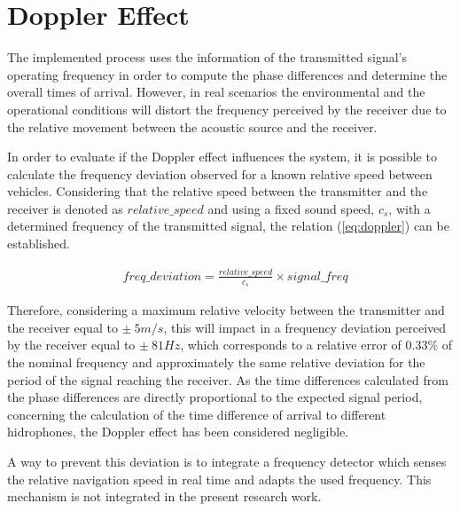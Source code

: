 \section{Doppler Effect}

The implemented process uses the information of the transmitted signal's operating frequency in order to compute the phase differences and determine the overall times of arrival. However, in real scenarios the environmental and the operational conditions will distort the frequency perceived by the receiver due to the relative movement between the acoustic source and the receiver.

In order to evaluate if the Doppler effect influences the system, it is possible to calculate the frequency deviation observed for a known relative speed between vehicles. Considering that the relative speed between the transmitter and the receiver is denoted as $relative\_speed$ and using a fixed sound speed, $c_s$, with a determined frequency of the transmitted signal, the relation (\ref{eq:doppler}) \cite{doppler-eq} can be established. 

\begin{eqnarray}
	&freq\_deviation = \frac{relative\_speed}{c_s} \times signal\_freq
	\label{eq:doppler}
\end{eqnarray}

Therefore, considering a maximum relative velocity between the transmitter and the receiver equal to $\pm \ 5 m/s$, this will impact in a frequency deviation perceived by the receiver equal to $\pm \ 81Hz$, which corresponds to a relative error of 0.33\% of the nominal frequency and approximately the same relative deviation for the period of the signal reaching the receiver. As the time differences calculated from the phase differences are directly proportional to the expected signal period, concerning the calculation of the time difference of arrival to different hidrophones, the Doppler effect has been considered negligible.

A way to prevent this deviation is to integrate a frequency detector which senses the relative navigation speed in real time and adapts the used frequency. This mechanism is not integrated in the present research work.